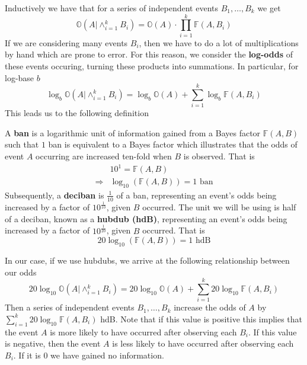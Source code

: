 \noindent Inductively we have that for a series of independent
events $B_1, \dots, B_k$ we get
\[
	\mathbb{O}(A|\wedge_{i=1}^k B_i) =
	\mathbb{O}(A)\cdot\prod_{i=1}^k{\mathbb{F}(A,B_i)}
\]
If we are considering many events $B_i$, then we have to do a lot
of multiplications by hand which are prone to error. For this
reason, we consider the {\bf{log-odds}} of these events occuring,
turning these products into summations. In particular, for log-base $b$
\[
	\log_b\mathbb{O}(A|\wedge_{i=1}^k B_i) =
	\log_b\mathbb{O}(A)+\sum_{i=1}^k{\log_b\mathbb{F}(A,B_i)}
\]
This leads us to the following definition
\begin{definition}
	A {\bf{ban}} is a logarithmic unit of information gained from a
	Bayes factor $\mathbb{F}(A,B)$ such that $1$ ban is equivalent to
	a Bayes factor which illustrates that the odds of event $A$
	occurring are increased ten-fold when $B$ is observed. That is
	\begin{align*}
		            & 10^1 = \mathbb{F}(A,B)                    \\
		\Rightarrow & \log_{10}(\mathbb{F}(A,B)) = 1\text{ ban}
	\end{align*}
	\noindent Subsequently, a {\bf{deciban}} is $\frac{1}{10}$ of a
	ban, representing an event's odds being increased by a factor of
	$10^\frac{1}{10}$, given $B$ occurred. The unit we will be using
	is half of a deciban, known as a {\bf{hubdub (hdB)}},
	representing an event's odds being increased by a factor of
	$10^\frac{1}{20}$, given $B$ occurred. That is
	\[
		20\log_{10}(\mathbb{F}(A,B)) = 1\text{ hdB}
	\]
\end{definition}
\noindent In our case, if we use hubdubs, we arrive at the
following relationship between our odds
\[
	20\log_{10}\mathbb{O}(A|\wedge_{i=1}^k B_i) =
	20\log_{10}\mathbb{O}(A)+\sum_{i=1}^k{20\log_{10}\mathbb{F}(A,B_i)}
\]
Then a series of independent events $B_1, \dots, B_k$ increase the
odds of $A$ by  $\sum_{i=1}^k{20\log_{10}\mathbb{F}(A,B_i)}$ hdB.
Note that if this value is positive this implies that the event $A$
is more likely to have occurred after observing each $B_i$. If this
value is negative, then the event $A$ is less likely to have
occurred after observing each $B_i$. If it is $0$ we have gained no
information.

